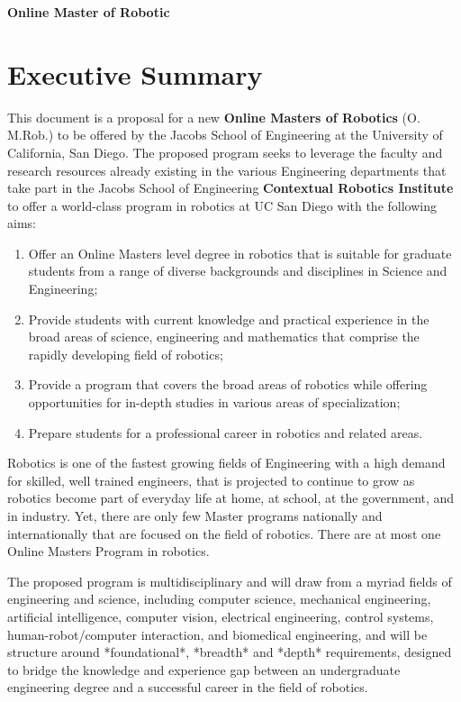 \documentclass[11pt,letterpaper]{article}
\def\thetitle{Online Master of Robotic}
\begin{document}
\begin{center}{\Large\bf {\thetitle}}\end{center}


\section*{Executive Summary}

This document is a proposal for a new {\bf Online Masters of Robotics} (O. M.Rob.)
to be offered by the Jacobs School of Engineering at the University of
California, San Diego. The proposed program seeks to leverage the
faculty and research resources already existing in the various
Engineering departments that take part in the Jacobs School of
Engineering {\bf Contextual Robotics Institute} to offer a world-class
program in robotics at UC San Diego with the following aims:

\begin{enumerate}
\item Offer an Online Masters level degree in robotics that is
  suitable for graduate students from a range of diverse backgrounds
  and disciplines in Science and Engineering;

\item Provide students with current knowledge and practical experience
  in the broad areas of science, engineering and mathematics that
  comprise the rapidly developing field of robotics;

\item Provide a program that covers the broad areas of robotics while
  offering opportunities for in-depth studies in various areas of
  specialization;

\item Prepare students for a professional career in robotics and
  related areas.
\end{enumerate}

Robotics is one of the fastest growing fields of Engineering with a
high demand for skilled, well trained engineers, that is projected to
continue to grow as robotics become part of everyday life at home, at
school, at the government, and in industry. Yet, there are only few
Master programs nationally and internationally that are focused on the
field of robotics. There are at most one Online Masters Program in
robotics.

The proposed program is multidisciplinary and will draw from a myriad
fields of engineering and science, including computer science,
mechanical engineering, artificial intelligence, computer vision,
electrical engineering, control systems, human-robot/computer
interaction, and biomedical engineering, and will be structure around
*foundational*, *breadth* and *depth* requirements, designed to bridge
the knowledge and experience gap between an undergraduate engineering
degree and a successful career in the field of robotics.
\end{document}
